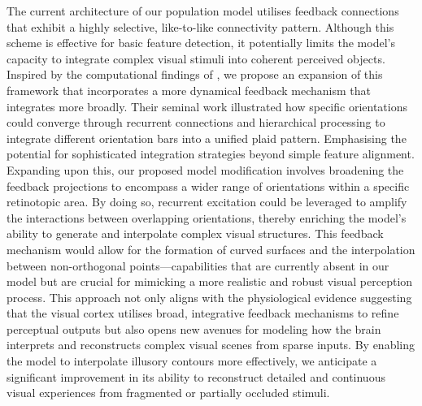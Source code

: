 \documentclass[12pt]{article}
\begin{document}
The current architecture of our population model utilises feedback connections that exhibit a highly selective, like-to-like connectivity pattern. Although this scheme is effective for basic feature detection, it potentially limits the model's capacity to integrate complex visual stimuli into coherent perceived objects. Inspired by the computational findings of \textcite{muirSpecificExcitatoryConnectivity2017}, we propose an expansion of this framework that incorporates a more dynamical feedback mechanism that integrates more broadly. Their seminal work illustrated how specific orientations could converge through recurrent connections and hierarchical processing to integrate different orientation bars into a unified plaid pattern. Emphasising the potential for sophisticated integration strategies beyond simple feature alignment. Expanding upon this, our proposed model modification involves broadening the feedback projections to encompass a wider range of orientations within a specific retinotopic area. By doing so, recurrent excitation could be leveraged to amplify the interactions between overlapping orientations, thereby enriching the model's ability to generate and interpolate complex visual structures. This feedback mechanism would allow for the formation of curved surfaces and the interpolation between non-orthogonal points—capabilities that are currently absent in our model but are crucial for mimicking a more realistic and robust visual perception process. This approach not only aligns with the physiological evidence suggesting that the visual cortex utilises broad, integrative feedback mechanisms to refine perceptual outputs but also opens new avenues for modeling how the brain interprets and reconstructs complex visual scenes from sparse inputs. By enabling the model to interpolate illusory contours more effectively, we anticipate a significant improvement in its ability to reconstruct detailed and continuous visual experiences from fragmented or partially occluded stimuli. 
\end{document}
